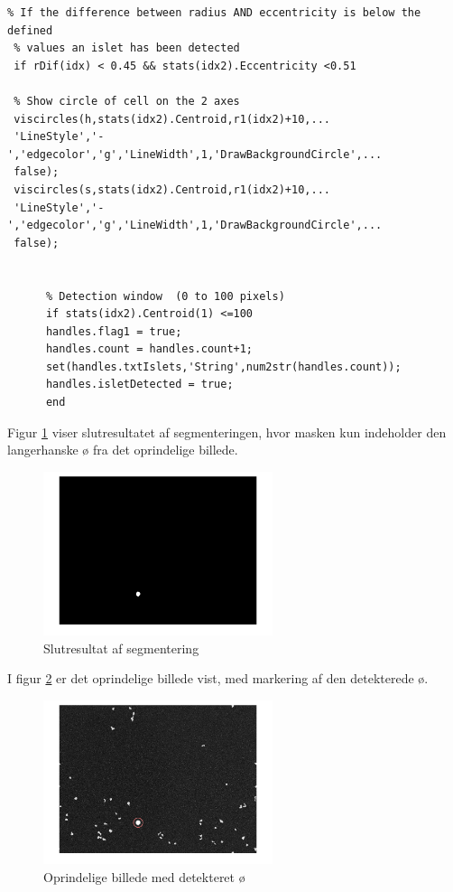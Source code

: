 \begin{lstlisting} 
% If the difference between radius AND eccentricity is below the defined
 % values an islet has been detected
 if rDif(idx) < 0.45 && stats(idx2).Eccentricity <0.51
     
 % Show circle of cell on the 2 axes
 viscircles(h,stats(idx2).Centroid,r1(idx2)+10,...
 'LineStyle','-','edgecolor','g','LineWidth',1,'DrawBackgroundCircle',...
 false);
 viscircles(s,stats(idx2).Centroid,r1(idx2)+10,...
 'LineStyle','-','edgecolor','g','LineWidth',1,'DrawBackgroundCircle',...
 false);

     
      % Detection window  (0 to 100 pixels)
      if stats(idx2).Centroid(1) <=100 
      handles.flag1 = true;
      handles.count = handles.count+1; 
      set(handles.txtIslets,'String',num2str(handles.count));
      handles.isletDetected = true;
      end
\end{lstlisting} 

Figur \ref{fig:segmented} viser slutresultatet af segmenteringen, hvor masken kun indeholder den langerhanske ø fra det oprindelige billede. 


\begin{figure}[H]
	\centering
	\includegraphics[width=0.6\textwidth]{billeder/software/segmented.png}
	\caption{Slutresultat af segmentering}
	\label{fig:segmented}
\end{figure}

I figur \ref{fig:finalimage} er det oprindelige billede vist, med markering af den detekterede ø.


\begin{figure}[H]
	\centering
	\includegraphics[width=0.6\textwidth]{billeder/software/finalimage.png}
	\caption{Oprindelige billede med detekteret ø}
	\label{fig:finalimage}
\end{figure}

